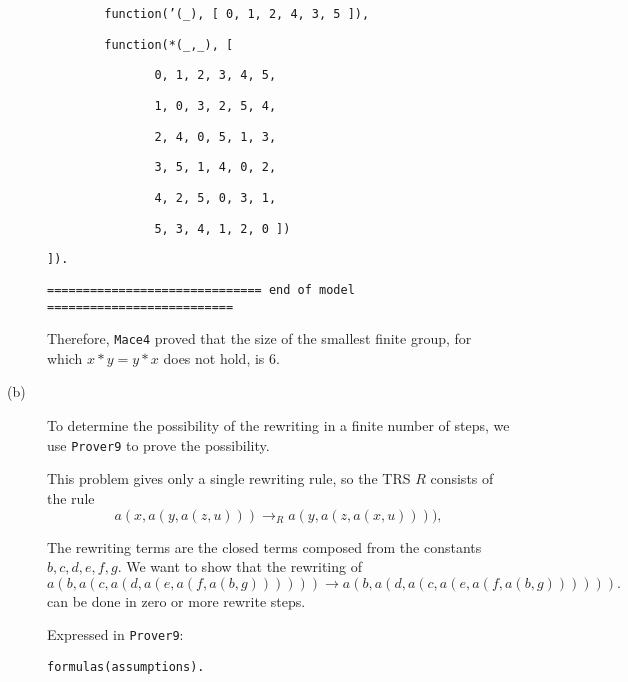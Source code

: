 \begin{description}
{\tt \ \ \ \ \ \ \ \ function('(\_), [ 0, 1, 2, 4, 3, 5 ]),}

{\tt \ \ \ \ \ \ \ \ function(*(\_,\_), [}

{\tt \	\	\	\ \ \ \	\	\	\ \ \ \ \ \ 0, 1, 2, 3, 4, 5,}

{\tt \	\	\	\ \ \ \	\	\	\ \ \ \ \ \ 1, 0, 3, 2, 5, 4,}

{\tt \	\	\	\ \ \ \	\	\	\ \ \ \ \ \ 2, 4, 0, 5, 1, 3,}
	
{\tt \	\	\	\ \ \ \	\	\	\ \ \ \ \ \ 3, 5, 1, 4, 0, 2,}

{\tt \	\	\	\ \ \ \	\	\	\ \ \ \ \ \ 4, 2, 5, 0, 3, 1,}

{\tt \	\	\	\ \ \ \	\	\	\ \ \ \ \ \ 5, 3, 4, 1, 2, 0 ])}

{\tt ]).}

{\tt ============================== end of model ==========================}

\vspace{3mm}

Therefore, {\tt Mace4} proved that the size of the smallest finite group, for which $ x \ast y = y \ast x $ does not hold, is 6.

  \item[(b)] To determine the possibility of the rewriting in a finite number of steps, we use {\tt Prover9} to prove the possibility.

  This problem gives only a single rewriting rule, so the TRS $R$ consists of the rule  \[ a(x, a(y, a(z, u))) \rightarrow_{R} a(y, a(z, a(x, u)))), \]

  The rewriting terms are the closed terms composed from the constants $b, c, d, e, f, g$. We want to show that the rewriting of \[ a(b, a(c, a(d, a(e, a(f, a(b, g)))))) \rightarrow a(b, a(d, a(c, a(e, a(f, a(b, g)))))). \] can be done in zero or more rewrite steps.



      Expressed in {\tt Prover9}:

\vspace{2mm}

{\footnotesize

{\tt formulas(assumptions).}



}
\end{description}
